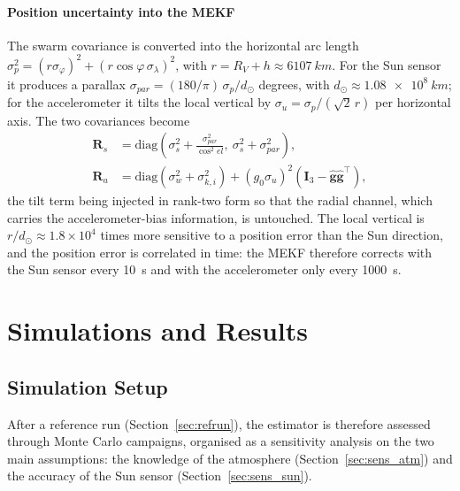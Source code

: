 \documentclass[preprint,12pt,a4paper]{elsarticle}
\begin{document}
\paragraph{Position uncertainty into the MEKF}
The swarm covariance is converted into the horizontal arc length
$\sigma_p^2=(r\sigma_\varphi)^2+(r\cos\varphi\,\sigma_\lambda)^2$, with
$r=R_V+h\approx\SI{6107}{km}$.
For the Sun sensor it produces a parallax $\sigma_{par}=(180/\pi)\,\sigma_p/d_\odot$ degrees,
with $d_\odot\approx\SI{1.08e8}{km}$; for the accelerometer it tilts the local vertical by
$\sigma_u=\sigma_p/(\sqrt2\,r)$ per horizontal axis.
The two covariances become
\begin{align}
\mathbf{R}_s&=\mathrm{diag}\left(\sigma_s^2+\frac{\sigma_{par}^2}{\cos^2el},\
\sigma_s^2+\sigma_{par}^2\right),\\
\mathbf{R}_a&=\mathrm{diag}(\sigma_w^2+\sigma_{k,i}^2)+(g_0\sigma_u)^2
\left(\mathbf{I}_3-\hat{\mathbf{g}}\hat{\mathbf{g}}^\top\right),
\end{align}
the tilt term being injected in rank-two form so that the radial channel, which carries the
accelerometer-bias information, is untouched.
The local vertical is $r/d_\odot\approx1.8\times10^4$ times more sensitive to a position error
than the Sun direction, and the position error is correlated in time: the MEKF therefore
corrects with the Sun sensor every \SI{10}{s} and with the accelerometer only every
\SI{1000}{s}.

\section{Simulations and Results}\label{sec:results}
\subsection{Simulation Setup}

After a reference run (Section~\ref{sec:refrun}), the estimator is therefore assessed through
Monte Carlo campaigns, organised as a sensitivity analysis on the two main assumptions: the knowledge of the atmosphere (Section~\ref{sec:sens_atm}) and the
accuracy of the Sun sensor (Section~\ref{sec:sens_sun}).
\end{document}
